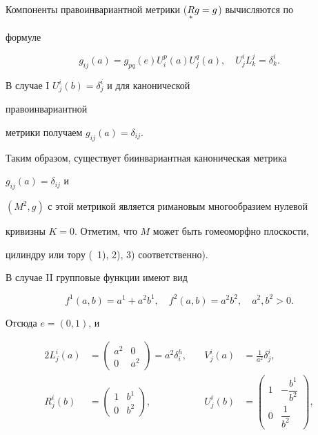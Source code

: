 Компоненты правоинвариантной метрики ($\underset{*}{R}{}g=g$) вычисляются по 


формуле 


\begin{equation} 


g_{i j}(a)=g_{p q}(e)U^p_i(a)U^q_j(a),\quad 


U^i_j L^j_k=\delta^i_k. 


\end{equation} 


В случае I\; $U^i_j(b)=\delta^i_j$ и для канонической 


правоинвариантной 


метрики получаем $g_{i j}(a)=\delta_{i j}$. 


Таким образом, существует биинвариантная каноническая метрика 


$g_{i j}(a)=\delta_{i j}$ и 


$(M^2,g)$ с этой метрикой является римановым многообразием нулевой 


кривизны $K=0$. Отметим, что $M$ может быть гомеоморфно плоскости, 


цилиндру или тору (~1), 2), 3) соответственно). 


 


В случае II групповые функции имеют вид 


$$ 


f^1(a,b)=a^1+a^2b^1,\quad 


f^2(a,b)=a^2b^2,\quad a^2,b^2>0. 


$$ 


Отсюда $e=(0,1)$, и 


\begin{alignat*}{2} 


L^i_j(a)&=\begin{pmatrix} 


a^2 & 0 \\ 0 & a^2 


\end{pmatrix} 


=a^2\delta^h_i, &\quad V^i_j(a)&=\frac{1}{a^2}\delta^i_j,\\ 


R^i_j(b)&=\begin{pmatrix} 


1 & b^1 \\ 0 & b^2 


\end{pmatrix} 


,& \quad U^i_j(b)&= 


\begin{pmatrix} 


1 & -\dfrac{b^1}{b^2}\\[3mm] 0 & \dfrac{1}{b^2} 


\end{pmatrix} 


, 


\end{alignat*} 


